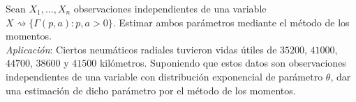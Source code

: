 \begin{ejercicio}
    Sean $X_1, \ldots, X_n$ observaciones independientes de una variable $X\rightsquigarrow\{\Gamma(p,a) : p,a>0\}$. Estimar ambos parámetros mediante el método de los momentos.\\

    \noindent
    \textit{Aplicación}: Ciertos neumáticos radiales tuvieron vidas útiles de $35200$, $41000$, $44700$, $38600$ y $41500$ kilómetros. Suponiendo que estos datos son observaciones independientes de una variable con distribución exponencial de parámetro $\theta$, dar una estimación de dicho parámetro por el método de los momentos.
\end{ejercicio}
